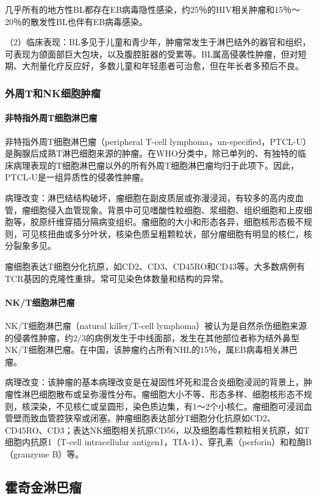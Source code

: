 几乎所有的地方性BL都存在EB病毒隐性感染，约25％的HIV相关肿瘤和15％～20％的散发性BL也伴有EB病毒感染。

（2）临床表现：BL多见于儿童和青少年，肿瘤常发生于淋巴结外的器官和组织，可表现为颌面部巨大包块，以及腹腔脏器的受累等。BL属高侵袭性肿瘤，但对短期、大剂量化疗反应好，多数儿童和年轻患者可治愈，但在年长者多预后不良。

\subsubsection{外周T和NK细胞肿瘤}

\paragraph{非特指外周T细胞淋巴瘤}
非特指外周T细胞淋巴瘤（peripheral T-cell
lymphoma，un-specified，PTCL-U）是胸腺后成熟T淋巴细胞来源的肿瘤。在WHO分类中，除已单列的、有独特的临床病理表现的T细胞淋巴瘤以外的所有外周T细胞淋巴瘤均归于此项下。因此，PTCL-U是一组异质性的侵袭性肿瘤。

病理改变：淋巴结结构破坏，瘤细胞在副皮质层或弥漫浸润，有较多的高内皮血管，瘤细胞侵入血管现象。背景中可见嗜酸性粒细胞、浆细胞、组织细胞和上皮细胞等，胶原纤维穿插分隔病变组织。瘤细胞的大小和形态各异，细胞核形态极不规则，可见核扭曲或多分叶状，核染色质呈粗颗粒状，部分瘤细胞有明显的核仁，核分裂象多见。

瘤细胞表达T细胞分化抗原，如CD2、CD3、CD45RO和CD43等。大多数病例有TCR基因的克隆性重排。常可见染色体数量和结构的异常。

\paragraph{NK/T细胞淋巴瘤}
NK/T细胞淋巴瘤（natural killer/T-cell
lymphoma）被认为是自然杀伤细胞来源的侵袭性肿瘤，约2/3的病例发生于中线面部，发生在其他部位者称为结外鼻型NK/T细胞淋巴瘤。在中国，该肿瘤约占所有NHL的15％，属EB病毒相关淋巴瘤。

病理改变：该肿瘤的基本病理改变是在凝固性坏死和混合炎细胞浸润的背景上，肿瘤性淋巴细胞散布或呈弥漫性分布。瘤细胞大小不等、形态多样、细胞核形态不规则，核深染，不见核仁或呈圆形，染色质边集，有1～2个小核仁。瘤细胞可浸润血管壁而致血管腔狭窄或闭塞。肿瘤细胞表达部分T细胞分化抗原如CD2、CD45RO、CD3；表达NK细胞相关抗原CD56，以及细胞毒性颗粒相关抗原，如T细胞内抗原1（T-cell
intracellular antigen1，TIA-1）、穿孔素（perforin）和粒酶B（granzyme
B）等。

\subsection{霍奇金淋巴瘤}

